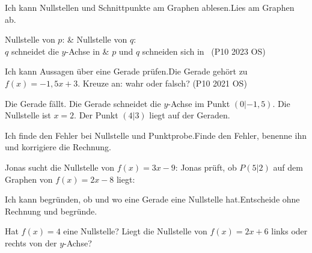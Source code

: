 \begin{aufgabe}{Ich kann Nullstellen und Schnittpunkte am Graphen ablesen.\newline Lies am Graphen ab.}

\begin{ksys}[xmin=-3,xmax=5,ymin=-4,ymax=5,ablesen]
\end{ksys}

\begin{teilezwei}
\tz Nullstelle von $p$: \quad {} & \tz Nullstelle von $q$: \quad {} \\
\tz $q$ schneidet die $y$-Achse in \punktfeld & \tz $p$ und $q$ schneiden sich in \punktfeld \ (P10 2023 OS) \\
\end{teilezwei}
\end{aufgabe}


\begin{aufgabe}{Ich kann Aussagen über eine Gerade prüfen.\newline Die Gerade gehört zu $f(x) = -1{,}5x + 3$. Kreuze an: wahr oder falsch? (P10 2021 OS)}
\begin{teile}
\teil Die Gerade fällt. \hfill {} 
\teil Die Gerade schneidet die $y$-Achse im Punkt $(0|{-1{,}5})$. \hfill {} 
\teil Die Nullstelle ist $x = 2$. \hfill {} 
\teil Der Punkt $(4|3)$ liegt auf der Geraden. \hfill {} 
\end{teile}
\end{aufgabe}

\begin{aufgabe}{Ich finde den Fehler bei Nullstelle und Punktprobe.\newline Finde den Fehler, benenne ihn und korrigiere die Rechnung.}
\begin{teile}
\teil Jonas sucht die Nullstelle von $f(x) = 3x - 9$:
\teil Jonas prüft, ob $P(5|2)$ auf dem Graphen von $f(x) = 2x - 8$ liegt:
\end{teile}
\end{aufgabe}

\begin{aufgabe}{Ich kann begründen, ob und wo eine Gerade eine Nullstelle hat.\newline Entscheide ohne Rechnung und begründe.}
\begin{teile}
\teil Hat $f(x) = 4$ eine Nullstelle?
\teil Liegt die Nullstelle von $f(x) = 2x + 6$ links oder rechts von der $y$-Achse?
\end{teile}
\end{aufgabe}

